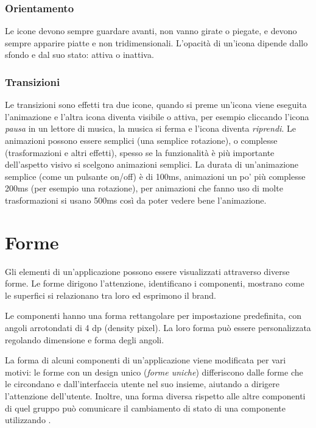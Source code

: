 \documentclass[12pt, a4paper]{report}
\begin{document}
			\subsubsection{Orientamento}
			Le icone devono sempre guardare avanti, non vanno girate o piegate, e devono sempre apparire piatte e non tridimensionali.
			L'opacità di un'icona dipende dallo sfondo e dal suo stato: attiva o inattiva.

			\subsubsection{Transizioni}
				Le transizioni sono effetti tra due icone, quando si preme un'icona viene eseguita l'animazione e l'altra icona diventa visibile o attiva, per esempio cliccando l'icona \textit{pausa} in un lettore di musica, la musica si ferma e l'icona diventa \textit{riprendi}.
				Le animazioni possono essere semplici (una semplice rotazione), o complesse (trasformazioni e altri effetti), spesso se la funzionalità è più importante dell'aspetto visivo si scelgono animazioni semplici.
				La durata di un'animazione semplice (come un pulsante on/off) è di 100ms, animazioni un po' più complesse 200ms (per esempio una rotazione), per animazioni che fanno uso di molte trasformazioni si usano 500ms così da poter vedere bene l'animazione.

	\section{Forme}
	Gli elementi di un’applicazione possono essere visualizzati attraverso diverse forme. Le forme dirigono l'attenzione, identificano i componenti, mostrano come le superfici si relazionano tra loro ed esprimono il brand.


	Le componenti hanno una forma rettangolare per impostazione predefinita, con angoli arrotondati di 4 dp (density pixel). La loro forma può essere personalizzata regolando dimensione e forma degli angoli.

	La forma di alcuni componenti di un’applicazione viene modificata per vari motivi: le forme con un design unico (\textit{forme uniche}) differiscono dalle forme che le circondano e dall'interfaccia utente nel suo insieme, aiutando a dirigere l'attenzione dell'utente.
	Inoltre, una forma diversa rispetto alle altre componenti di quel gruppo può comunicare il cambiamento di stato di una componente utilizzando .
\end{document}
